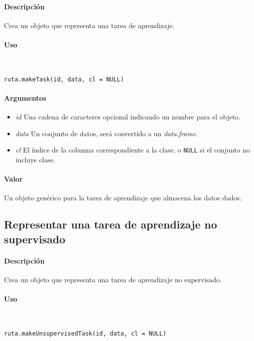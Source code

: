 \paragraph{Descripción}
Crea un objeto que representa una tarea de aprendizaje.

\paragraph{Uso}
~

\begin{lstlisting}
ruta.makeTask(id, data, cl = NULL)
\end{lstlisting}

\paragraph{Argumentos}
\begin{itemize}
\item \emph{id}	Una cadena de caracteres opcional indicando un nombre para el objeto.
\item \emph{data}	Un conjunto de datos, será convertido a un \emph{data.frame}.
\item \emph{cl}	El índice de la columna correspondiente a la clase, o \texttt{NULL} si el conjunto no incluye clase.
\end{itemize}

\paragraph{Valor}
Un objeto genérico para la tarea de aprendizaje que almacena los datos dados.

\subsection{Representar una tarea de aprendizaje no supervisado}

\paragraph{Descripción}
Crea un objeto que representa una tarea de aprendizaje no supervisado.

\paragraph{Uso}
~

\begin{lstlisting}
ruta.makeUnsupervisedTask(id, data, cl = NULL)
\end{lstlisting}

